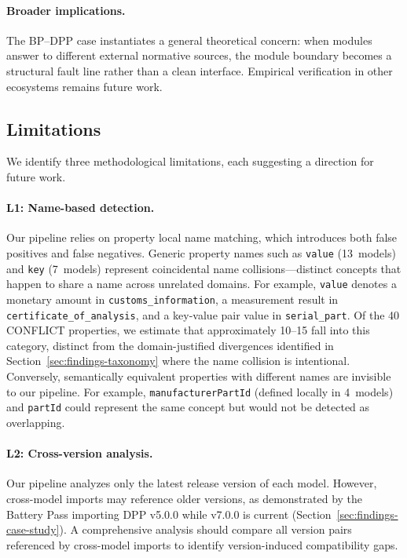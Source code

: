 \documentclass[]{ceurart}
\begin{document}
\paragraph{Broader implications.}
The BP--DPP case instantiates a general theoretical concern: when modules
answer to different external normative sources, the module boundary becomes
a structural fault line rather than a clean interface. Empirical
verification in other ecosystems remains future work.

\subsection{Limitations}\label{sec:findings-limits}

We identify three methodological limitations, each suggesting a
direction for future work.

\paragraph{L1: Name-based detection.}
Our pipeline relies on property local name matching, which introduces
both false positives and false negatives. Generic property names such as
\texttt{value} (13~models) and \texttt{key} (7~models) represent
coincidental name collisions---distinct concepts that happen to share a
name across unrelated domains. For example, \texttt{value} denotes a
monetary amount in \texttt{customs\_information}, a measurement result in
\texttt{certificate\_of\_analysis}, and a key-value pair value in
\texttt{serial\_part}. Of the 40 CONFLICT properties, we estimate that
approximately 10--15 fall into this category, distinct from the
domain-justified divergences identified in
Section~\ref{sec:findings-taxonomy} where the name collision is
intentional. Conversely, semantically equivalent properties with different
names are invisible to our pipeline. For example,
\texttt{manufacturerPartId} (defined locally in 4~models) and
\texttt{partId} could represent the same concept but would not be
detected as overlapping.

\paragraph{L2: Cross-version analysis.}
Our pipeline analyzes only the latest release version of each model.
However, cross-model imports may reference older versions, as
demonstrated by the Battery Pass importing DPP v5.0.0 while v7.0.0 is
current (Section~\ref{sec:findings-case-study}). A comprehensive analysis
should compare all version pairs referenced by cross-model imports to
identify version-induced compatibility gaps.
\end{document}
